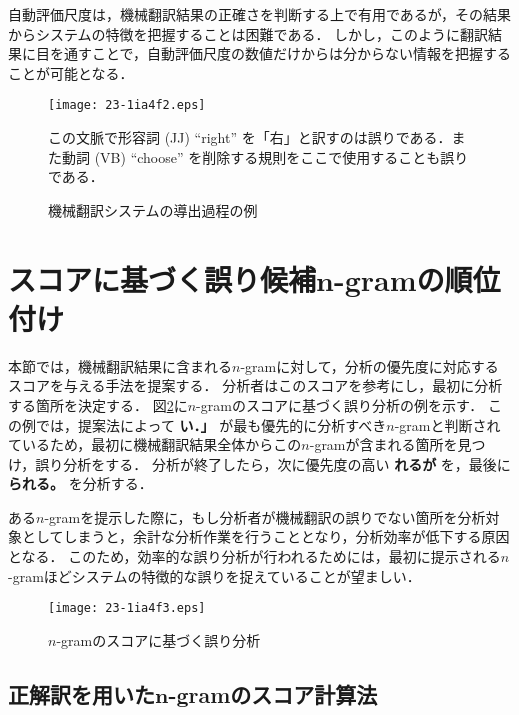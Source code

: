 \documentclass[japanese]{jnlp_1.4}
\newcommand{\textcolor}[2]{}
\begin{document}
自動評価尺度は，機械翻訳結果の正確さを判断する上で有用であるが，その結果からシステムの特徴を把握することは困難である．
しかし，このように翻訳結果に目を通すことで，自動評価尺度の数値だけからは分からない情報を把握することが可能となる．

\begin{figure}[t]
\begin{center}
\texttt{[image: 23-1ia4f2.eps]}
\end{center}
\caption{機械翻訳システムの導出過程の例}
\small
この文脈で形容詞 (JJ) ``right'' を「右」と訳すのは誤りである．また動詞 (VB) ``choose'' を削除する規則をここで使用することも誤りである．
\label{fig:wrong-trans-t2s}
\end{figure}


\section{スコアに基づく誤り候補$\boldsymbol{n}$-gramの順位付け}
\label{sec:scoring}

\textcolor{black}{機械翻訳の誤り箇所を自動的に提示する際に，単純に誤り箇所を列挙するのではなく，
より誤りの可能性が高い箇所から順に示すことができれば，後の人手による誤り分析の効率が上がると考えられる．}
本節では，機械翻訳結果に含まれる$n$-gramに対して，分析の優先度に対応するスコアを与える手法を提案する．
分析者はこのスコアを参考にし，最初に分析する箇所を決定する．
図\ref{fig:scoring-ex-part}に$n$-gramのスコアに基づく誤り分析の例を示す．
この例では，提案法によって \textbf{い．」} が最も優先的に分析すべき$n$-gramと判断されているため，最初に機械翻訳結果全体からこの$n$-gramが含まれる箇所を見つけ，誤り分析をする．
分析が終了したら，次に優先度の高い \textbf{れるが} を，最後に \textbf{られる。} を分析する．

ある$n$-gramを提示した際に，もし分析者が機械翻訳の誤りでない箇所を分析対象としてしまうと，余計な分析作業を行うこととなり，分析効率が低下する原因となる．
このため，効率的な誤り分析が行われるためには，最初に提示される$n$-gramほどシステムの特徴的な誤りを捉えていることが望ましい．

\begin{figure}[t]
\begin{center}
\texttt{[image: 23-1ia4f3.eps]}
\end{center}
\caption{$n$-gramのスコアに基づく誤り分析}
\label{fig:scoring-ex-part}
\end{figure}


\subsection{正解訳を用いた$\boldsymbol{n}$-gramのスコア計算法}
\end{document}
